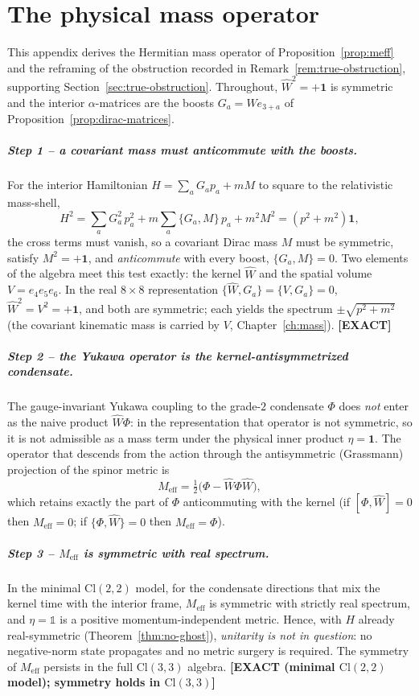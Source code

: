 \documentclass[11pt,oneside]{book}
\newcommand{\Wh}{\hat{W}}                         %
\newcommand{\Cl}{\mathrm{Cl}}                     %
\newcommand{\status}[1]{{\sffamily\bfseries\color{statuscol}[#1]}}
\theoremstyle{plain}
\theoremstyle{definition}
\theoremstyle{remark}
\begin{document}
\chapter{The physical mass operator}
\label{app:meff-deriv}

This appendix derives the Hermitian mass operator of Proposition~\ref{prop:meff} and the
reframing of the obstruction recorded in Remark~\ref{rem:true-obstruction}, supporting
Section~\ref{sec:true-obstruction}. Throughout, $\Wh^2=+\mathbf 1$ is symmetric and the
interior $\alpha$-matrices are the boosts $G_a=\Wh e_{3+a}$ of
Proposition~\ref{prop:dirac-matrices}.

\paragraph{Step 1 -- a covariant mass must anticommute with the boosts.}
For the interior Hamiltonian $H=\sum_a G_a p_a+mM$ to square to the relativistic mass-shell,
\[
  H^2=\sum_a G_a^2\,p_a^2+m\sum_a\{G_a,M\}\,p_a+m^2M^2=(p^2+m^2)\mathbf 1,
\]
the cross terms must vanish, so a covariant Dirac mass $M$ must be symmetric, satisfy
$M^2=+\mathbf 1$, and \emph{anticommute} with every boost, $\{G_a,M\}=0$. Two elements of the
algebra meet this test exactly: the kernel $\Wh$ and the spatial volume $V=e_4e_5e_6$. In the
real $8\times8$ representation $\{\Wh,G_a\}=\{V,G_a\}=0$, $\Wh^2=V^2=+\mathbf 1$, and both are
symmetric; each yields the spectrum $\pm\sqrt{p^2+m^2}$ (the covariant kinematic mass is
carried by $V$, Chapter~\ref{ch:mass}). \status{EXACT}

\paragraph{Step 2 -- the Yukawa operator is the kernel-antisymmetrized condensate.}
The gauge-invariant Yukawa coupling to the grade-$2$ condensate $\Phi$ does \emph{not} enter as
the naive product $\Wh\Phi$: in the representation that operator is not symmetric, so it is not
admissible as a mass term under the physical inner product $\eta=\mathbf 1$. The operator that
descends from the action through the antisymmetric (Grassmann) projection of the spinor metric
is
\[
  M_{\mathrm{eff}}=\tfrac12\bigl(\Phi-\Wh\Phi\Wh\bigr),
\]
which retains exactly the part of $\Phi$ anticommuting with the kernel (if $[\Phi,\Wh]=0$ then
$M_{\mathrm{eff}}=0$; if $\{\Phi,\Wh\}=0$ then $M_{\mathrm{eff}}=\Phi$).

\paragraph{Step 3 -- $M_{\mathrm{eff}}$ is symmetric with real spectrum.}
In the minimal $\Cl(2,2)$ model, for the condensate directions that mix the kernel time with the
interior frame, $M_{\mathrm{eff}}$ is symmetric with strictly real spectrum, and $\eta=\mathbb
1$ is a positive momentum-independent metric. Hence, with $H$ already real-symmetric
(Theorem~\ref{thm:no-ghost}), \emph{unitarity is not in question}: no negative-norm state
propagates and no metric surgery is required. The symmetry of $M_{\mathrm{eff}}$ persists in the
full $\Cl(3,3)$ algebra. \status{EXACT (minimal $\Cl(2,2)$ model); symmetry holds in $\Cl(3,3)$}
\end{document}
